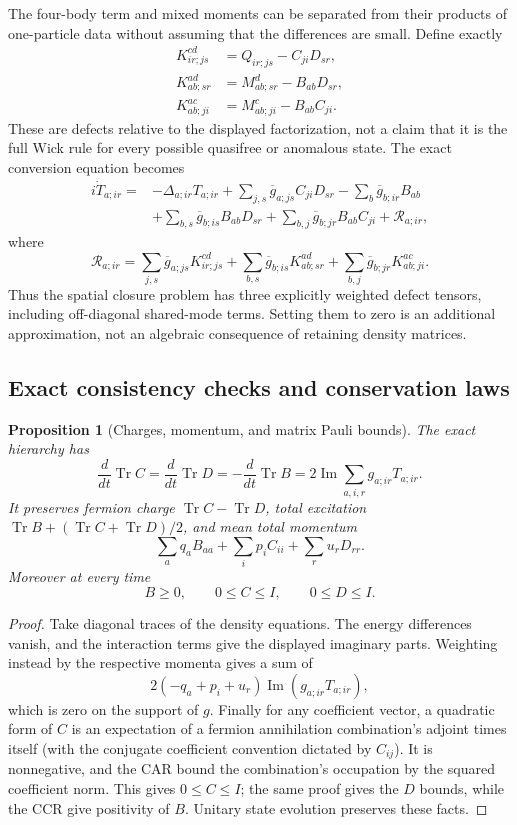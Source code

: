 \documentclass[11pt]{article}
\newtheorem{proposition}[theorem]{Proposition}
\theoremstyle{remark}
\begin{document}
The four-body term and mixed moments can be separated
from their products of one-particle data without assuming
that the differences are small.  Define exactly
\[
 \begin{aligned}
 K^{cd}_{ir;js}&=Q_{ir;js}-C_{ji}D_{sr},\\
 K^{ad}_{ab;sr}&=M^d_{ab;sr}-B_{ab}D_{sr},\\
 K^{ac}_{ab;ji}&=M^c_{ab;ji}-B_{ab}C_{ji}.
 \end{aligned}
\]
These are defects relative to the displayed factorization,
not a claim that it is the full Wick rule for every
possible quasifree or anomalous state.
The exact conversion equation becomes
\[
 \begin{split}
 i\dot T_{a;ir}={}&-\Delta_{a;ir}T_{a;ir}
  +\sum_{j,s}\overline g_{a;js}C_{ji}D_{sr}
  -\sum_b\overline g_{b;ir}B_{ab}\\
 &+\sum_{b,s}\overline g_{b;is}B_{ab}D_{sr}
  +\sum_{b,j}\overline g_{b;jr}B_{ab}C_{ji}
  +\mathcal R_{a;ir},
 \end{split}
\]
where
\[
 \mathcal R_{a;ir}
 =\sum_{j,s}\overline g_{a;js}K^{cd}_{ir;js}
  +\sum_{b,s}\overline g_{b;is}K^{ad}_{ab;sr}
  +\sum_{b,j}\overline g_{b;jr}K^{ac}_{ab;ji}.
\]
Thus the spatial closure problem has three explicitly
weighted defect tensors, including off-diagonal shared-mode
terms.  Setting them to zero is an additional approximation,
not an algebraic consequence of retaining density matrices.

\subsection{Exact consistency checks and conservation laws}

\begin{proposition}[Charges, momentum, and matrix Pauli bounds]
\label{prop:v20v69-conservation}
The exact hierarchy has
\[
 \frac{d}{dt}\operatorname{Tr}C
 =\frac{d}{dt}\operatorname{Tr}D
 =-\frac{d}{dt}\operatorname{Tr}B
 =2\operatorname{Im}\sum_{a,i,r}g_{a;ir}T_{a;ir}.
\]
It preserves fermion charge \(\operatorname{Tr}C-\operatorname{Tr}D\),
total excitation \(\operatorname{Tr}B+
(\operatorname{Tr}C+\operatorname{Tr}D)/2\), and mean
total momentum
\[
 \sum_aq_aB_{aa}+\sum_ip_iC_{ii}+\sum_ru_rD_{rr}.
\]
Moreover at every time
\[
 B\geq0,\qquad 0\leq C\leq I,\qquad 0\leq D\leq I .
\]
\end{proposition}
\begin{proof}
Take diagonal traces of the density equations.  The
energy differences vanish, and the interaction terms
give the displayed imaginary parts.  Weighting instead
by the respective momenta gives a sum of
\[
 2(-q_a+p_i+u_r)\operatorname{Im}(g_{a;ir}T_{a;ir}),
\]
which is zero on the support of \(g\).
Finally for any coefficient vector, a quadratic form
of \(C\) is an expectation of a fermion annihilation
combination's adjoint times itself (with the conjugate
coefficient convention dictated by \(C_{ij}\)).
It is nonnegative, and the CAR bound the combination's
occupation by the squared coefficient norm.  This gives
\(0\leq C\leq I\); the same proof gives the \(D\) bounds,
while the CCR give positivity of \(B\).
Unitary state evolution preserves these facts.
\end{proof}
\end{document}
